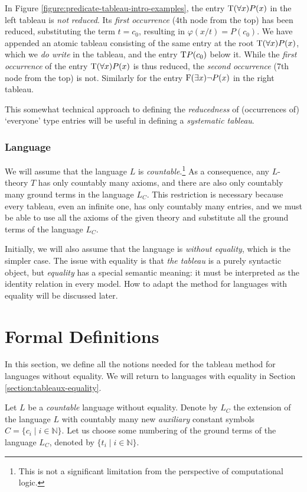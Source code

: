 In Figure \ref{figure:predicate-tableau-intro-examples}, the entry $\mathrm{T}(\forall x)P(x)$ in the left tableau is \emph{not} \emph{reduced}. Its \emph{first occurrence} (4th node from the top) has been reduced, substituting the term $t=c_0$, resulting in $\varphi(x/t)=P(c_0)$. We have appended an atomic tableau consisting of the same entry at the root $\mathrm{T}(\forall x)P(x)$, which we \emph{do write} in the tableau, and the entry $\mathrm{T} P(c_0)$ below it. While the \emph{first occurrence} of the entry $\mathrm{T}(\forall x)P(x)$ is thus reduced, the \emph{second occurrence} (7th node from the top) is not. Similarly for the entry $\mathrm{F}(\exists x)\neg P(x)$ in the right tableau.

This somewhat technical approach to defining the \emph{reducedness} of (occurrences of) `everyone' type entries will be useful in defining a \emph{systematic tableau}.

\subsubsection{Language}

We will assume that the language $L$ is \emph{countable}.\footnote{This is not a significant limitation from the perspective of computational logic.} As a consequence, any $L$-theory $T$ has only countably many axioms, and there are also only countably many ground terms in the language $L_C$. This restriction is necessary because every tableau, even an infinite one, has only countably many entries, and we must be able to use all the axioms of the given theory and substitute all the ground terms of the language $L_C$.

Initially, we will also assume that the language is \emph{without equality}, which is the simpler case. The issue with equality is that \emph{the tableau} is a purely syntactic object, but \emph{equality} has a special semantic meaning: it must be interpreted as the identity relation in every model. How to adapt the method for languages with equality will be discussed later.

\section{Formal Definitions}

In this section, we define all the notions needed for the tableau method for languages without equality. We will return to languages with equality in Section \ref{section:tableaux-equality}.

Let $L$ be a \emph{countable} language without equality. Denote by $L_C$ the extension of the language $L$ with countably many new \emph{auxiliary} constant symbols $C=\{c_i\mid i\in \mathbb N\}$. Let us choose some numbering of the ground terms of the language $L_C$, denoted by $\{t_i\mid i\in\mathbb N\}$.

